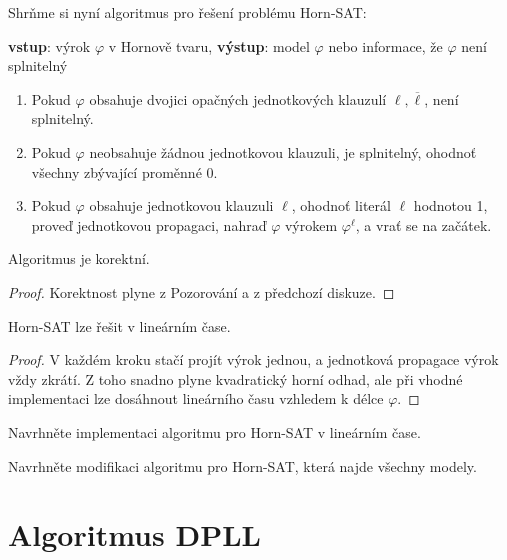 Shrňme si nyní algoritmus pro řešení problému Horn-SAT: 

\begin{algorithm}
\textbf{vstup}: výrok $\varphi$ v Hornově tvaru, \textbf{výstup}: model $\varphi$ nebo informace, že $\varphi$ není splnitelný
\begin{enumerate}
    \item Pokud $\varphi$ obsahuje dvojici opačných jednotkových klauzulí $\ell,\overline{\ell}$, není splnitelný.
    \item Pokud $\varphi$ neobsahuje žádnou jednotkovou klauzuli, je splnitelný, ohodnoť všechny zbývající proměnné 0.
    \item Pokud $\varphi$ obsahuje jednotkovou klauzuli $\ell$, ohodnoť literál $\ell$ hodnotou 1, proveď jednotkovou propagaci, nahraď $\varphi$ výrokem $\varphi^\ell$, a vrať se na začátek.
\end{enumerate}
\end{algorithm}

\begin{proposition}
Algoritmus je korektní.    
\end{proposition}
\begin{proof}
Korektnost plyne z Pozorování a z předchozí diskuze.
\end{proof}

\begin{corollary}
    Horn-SAT lze řešit v lineárním čase.
\end{corollary}

\begin{proof}
V každém kroku stačí projít výrok jednou, a jednotková propagace výrok vždy zkrátí. Z toho snadno plyne kvadratický horní odhad, ale při vhodné implementaci lze dosáhnout lineárního času vzhledem k délce $\varphi$.
\end{proof}


\begin{exercise}
Navrhněte implementaci algoritmu pro Horn-SAT v lineárním čase.
\end{exercise}

\begin{exercise}
Navrhněte modifikaci algoritmu pro Horn-SAT, která najde všechny modely.
\end{exercise}


\section{Algoritmus DPLL}\label{section:DPLL}

